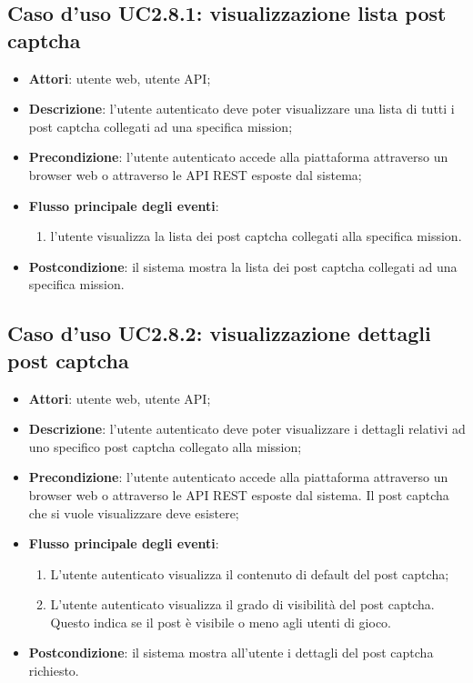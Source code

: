 \subsection{Caso d'uso UC2.8.1: visualizzazione lista post captcha}
\begin{itemize}
\item \textbf{Attori}: utente web, utente API;
\item \textbf{Descrizione}: l'utente autenticato deve poter visualizzare una lista di tutti i post captcha collegati ad una specifica mission; 
      \item \textbf{Precondizione}: l'utente autenticato accede alla piattaforma attraverso un browser web o attraverso le API REST esposte dal sistema;

        \item \textbf{Flusso principale degli eventi}:
          \begin{enumerate}
          \item l'utente visualizza la lista dei post captcha collegati alla specifica mission.

      \end{enumerate}
    \item \textbf{Postcondizione}: il sistema mostra la lista dei post captcha collegati ad una specifica mission.
  \end{itemize}
\hypertarget{UC2.8.2}{}
\subsection{Caso d'uso UC2.8.2: visualizzazione dettagli post captcha}
\begin{itemize}
\item \textbf{Attori}: utente web, utente API;
\item \textbf{Descrizione}: l'utente autenticato deve poter visualizzare i dettagli relativi ad uno specifico post captcha collegato alla mission; 
      \item \textbf{Precondizione}: l'utente autenticato accede alla piattaforma attraverso un browser web o attraverso le API REST esposte dal sistema. Il post captcha che si vuole visualizzare deve esistere;

        \item \textbf{Flusso principale degli eventi}:
          \begin{enumerate}
          \item L'utente autenticato visualizza il contenuto di default del post captcha;
          \item L'utente autenticato visualizza il grado di visibilità del post captcha. Questo indica se il post è visibile o meno agli utenti di gioco.

      \end{enumerate}
    \item \textbf{Postcondizione}: il sistema mostra all'utente i dettagli del post captcha richiesto.
  \end{itemize}
\hypertarget{UC2.8.3}{}
